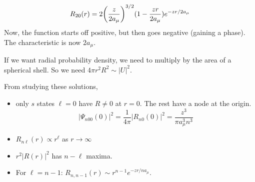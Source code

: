 \[ R_{20}(r) = 2 \qty(\frac{z}{2 a_{\mu}})^{3/2} (1 - \frac{zr}{2 a_{\mu}}) e^{-zr/2a_{\mu}} \]
Now, the function starts off positive, but then goes negative (gaining a phase). The characteristic is now $2 a_{\mu}$.

If we want radial probability density, we need to multiply by the area of a spherical shell. So we need $4 \pi r^2 R^2 \sim |U|^2$.

From studying these solutions, 

\begin{itemize}
\item only $s$ states $\ell = 0$ have $R \neq 0$ at $r = 0$. The rest have a node at the origin.
\[ |\Psi_{n 0 0}(0)|^2 = \frac{1}{4 \pi} |R_{n 0}(0)|^2 = \frac{z^3}{\pi a_{\mu}^3 n^3} \]
\item $R_{n\ell}(r) \propto r^\ell$ as $r \to \infty$
\item $r^2 |R(r)|^2$ has $n - \ell$ maxima. 
\item For $\ell = n - 1$: $R_{n, n - 1}(r) \sim r^{n - 1} e^{-zr/na_{\mu}}$.
\end{itemize}